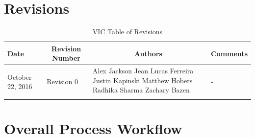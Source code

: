 \documentclass [12pt]{article}
\begin{document}

\pagebreak

\tableofcontents
\listoftables

\pagebreak


\section{Revisions}
\begin{longtable}{| p{ } | p{ } | p{ } | p{ } |}

\hline 
\centering \textbf{Date} & 
\multicolumn{1}{c}{\textbf {Revision Number}} &
\multicolumn{1}{|c}{\textbf {Authors}} & 
\multicolumn{1}{|c|}{\textbf {Comments}} \\ \hline

\multirow{4}{*}{\centering October 22, 2016}  & 
\multirow{4}{*}{Revision 0}& 
{Alex Jackson \newline
Jean Lucas Ferreira \newline
Justin Kapinski\newline
Matthew Hobers\newline
Radhika Sharma\newline
Zachary Bazen}
&
\multirow{4}{*}{-} \\ 
\hline 

\caption{VIC Table of Revisions} 
\end{longtable}








\pagebreak


\section{Overall Process Workflow}
\end{document}
